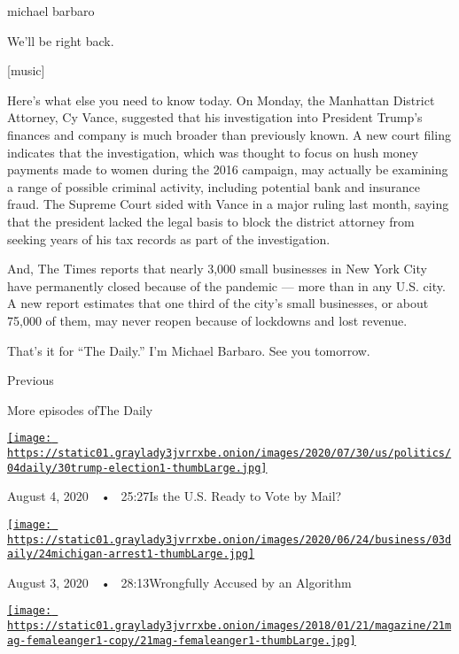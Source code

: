 michael barbaro

We'll be right back.

{[}music{]}

Here's what else you need to know today. On Monday, the Manhattan
District Attorney, Cy Vance, suggested that his investigation into
President Trump's finances and company is much broader than previously
known. A new court filing indicates that the investigation, which was
thought to focus on hush money payments made to women during the 2016
campaign, may actually be examining a range of possible criminal
activity, including potential bank and insurance fraud. The Supreme
Court sided with Vance in a major ruling last month, saying that the
president lacked the legal basis to block the district attorney from
seeking years of his tax records as part of the investigation.

And, The Times reports that nearly 3,000 small businesses in New York
City have permanently closed because of the pandemic --- more than in
any U.S. city. A new report estimates that one third of the city's small
businesses, or about 75,000 of them, may never reopen because of
lockdowns and lost revenue.

That's it for ``The Daily.'' I'm Michael Barbaro. See you tomorrow.

Previous

More episodes ofThe Daily

\href{https://www.nytimes3xbfgragh.onion/2020/08/04/podcasts/the-daily/mail-in-voting-president-trump.html?action=click\&module=audio-series-bar\&region=header\&pgtype=Article}{\texttt{[image: https://static01.graylady3jvrrxbe.onion/images/2020/07/30/us/politics/04daily/30trump-election1-thumbLarge.jpg]}}

August 4, 2020~~•~ 25:27Is the U.S. Ready to Vote by Mail?

\href{https://www.nytimes3xbfgragh.onion/2020/08/03/podcasts/the-daily/algorithmic-justice-racism.html?action=click\&module=audio-series-bar\&region=header\&pgtype=Article}{\texttt{[image: https://static01.graylady3jvrrxbe.onion/images/2020/06/24/business/03daily/24michigan-arrest1-thumbLarge.jpg]}}

August 3, 2020~~•~ 28:13Wrongfully Accused by an Algorithm

\href{https://www.nytimes3xbfgragh.onion/2020/08/02/podcasts/the-daily/on-female-rage.html?action=click\&module=audio-series-bar\&region=header\&pgtype=Article}{\texttt{[image: https://static01.graylady3jvrrxbe.onion/images/2018/01/21/magazine/21mag-femaleanger1-copy/21mag-femaleanger1-thumbLarge.jpg]}}

